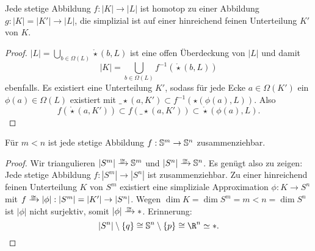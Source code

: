 \begin{st}
	Jede stetige Abbildung $f: |K| \to |L|$ ist homotop zu einer Abbildung $g: |K| = |K'| \to |L|$, die simplizial ist auf einer hinreichend feinen Unterteilung $K'$ von $K$.
	\begin{proof}
		$|L| = \bigcup_{b\in \Omega(L)} \mathring\star(b,L)$ ist eine offen Überdeckung von $|L|$ und damit
		\[
			|K| = \bigcup_{b\in\Omega(L)} f^{-1}(\mathring\star(b,L))
		\]
		ebenfalls.
		Es existiert eine Unterteilung $K'$, sodass für jede Ecke $a \in \Omega(K')$ ein $\phi(a) \in \Omega(L)$ existiert mit $\_\star(a, K') \subset f^{-1}(\star(\phi(a),L))$.
		Also
		\[
			f(\mathring \star(a,K'))
			\subset f(\_\star(a,K'))
			\subset \mathring\star(\phi(a),L).
		\]
	\end{proof}
\end{st}

\begin{st} \label{spheres_function_null-homotopic}
	Für $m < n$ ist jede stetige Abbildung $f: \S^m \to \S^n$ zusammenziehbar.
	\begin{proof}
		Wir triangulieren $|S^m| \homto \S^m$ und $|S^n| \homto \S^n$.
		Es genügt also zu zeigen: Jede stetige Abbildung $f: |S^m| \to |S^n|$ ist zusammenziehbar.
		Zu einer hinreichend feinen Unterteilung $K$ von $S^m$ existiert eine simpliziale Approximation $\phi: K \to S^n$ mit $f \homto |\phi|: |S^m| = |K'| \to |S^n|$.
		Wegen $\dim K = \dim S^m = m < n = \dim S^n$ ist $|\phi|$ nicht surjektiv, somit $|\phi| \homto *$.
		Erinnerung:
		\[
			|S^n| \setminus \{q\} \homeomorphic \S^n \setminus \{p\} \homeomorphic \R^n \homotopic *.
		\]
	\end{proof}
\end{st}
